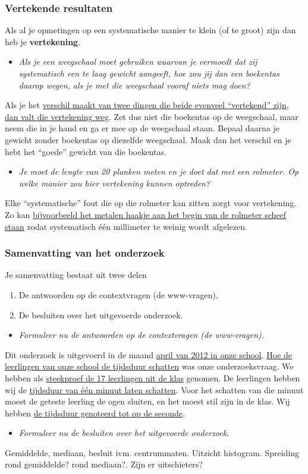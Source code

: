 \documentclass[dutch]{beamer}
\newcommand{\vraag}[1]{\begin{itemize}\item[Vraag:] {\it #1}\end{itemize}}
\begin{document}
\begin{frame}
\frametitle{Vertekende resultaten}
Als al je opmetingen op een systematische manier te klein (of te groot) zijn dan heb je {\bf vertekening}.\\
\vspace*{0.5cm}
\pause
\vraag{Als je een weegschaal moet gebruiken waarvan je vermoedt dat zij systematisch een te laag gewicht
aangeeft, hoe zou jij dan een boekentas daarop wegen, als je met die weegschaal vooraf niets
mag doen?}
\pause
{
Als je het \uline{verschil maakt van twee dingen die beide evenveel “vertekend” zijn, dan valt die
vertekening weg}. Zet dus niet die boekentas op de weegschaal, maar neem die in je hand en
ga er mee op de weegschaal staan. Bepaal daarna je gewicht zonder boekentas op diezelfde
weegschaal. Maak dan het verschil en je hebt het “goede” gewicht van die boekentas.}
\pause
\vraag{Je moet de lengte van 20 planken meten en je doet dat met een rolmeter. Op welke manier
zou hier vertekening kunnen optreden?}
\pause
Elke “systematische” fout die op die rolmeter kan zitten zorgt voor vertekening. Zo kan
\uline{bijvoorbeeld het metalen haakje aan het begin van de rolmeter scheef staan} zodat
systematisch één millimeter te weinig wordt afgelezen.
\end{frame}

\begin{frame}
\frametitle{Samenvatting van het onderzoek}
Je samenvatting bestaat uit twee delen
\begin{enumerate}
  \item De antwoorden op de contextvragen (de www-vragen),
  \item De besluiten over het uitgevoerde onderzoek.
\end{enumerate}
\pause
\vraag{Formuleer nu de antwoorden op de contextvragen (de www-vragen).}
\pause
Dit onderzoek is uitgevoerd in de maand \uline{april van 2012 in onze school}. \uline{Hoe de leerlingen van onze school de tijdsduur schatten} was onze onderzoeksvraag.  We hebben als \uline{steekproef de 17 leerlingen uit de klas} genomen. De leerlingen hebben wij de \uline{tijdsduur van één minuut laten schatten}. Voor het schatten van die minuut moest de geteste leerling de ogen sluiten, en het moest stil zijn in de klas. Wij hebben \uline{de tijdsduur genoteerd tot op de seconde}.
\pause
\vraag{Formuleer nu de besluiten over het uitgevoerde onderzoek.}
Gemiddelde, mediaan, besluit ivm. centrummaten. Uitzicht histogram. Spreiding rond gemiddelde? rond mediaan?. Zijn er uitschieters?
\end{frame}
\end{document}
